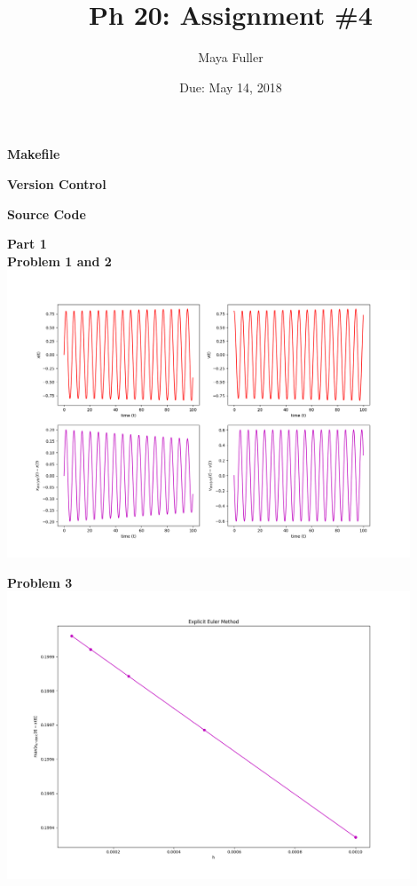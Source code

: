 \documentclass[12pt]{article}
\title{Ph 20: Assignment \#4}
\author{Maya Fuller}
\date{Due: May 14, 2018} %
\begin{document}
	
	
	\maketitle

	\noindent\textbf{\large Makefile}
	
	
	\noindent\textbf{\large Version Control}
	
	
	\noindent\textbf{\large Source Code}
	
	
	\noindent\textbf{\large Part 1}\\
	
	\indent\textbf{Problem 1 and 2}\\
		\includegraphics[width=0.9\textwidth]{vstimePlots.png}
		
	\indent\textbf{Problem 3}\\
		\includegraphics[width=0.9\textwidth]{errorPlot.png}
		
\end{document}
